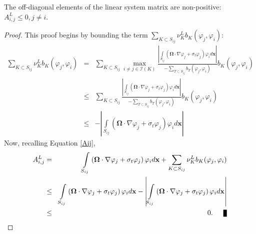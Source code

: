 \newpage
\begin{lemma}\label{offdiagonalnegative}
   The off-diagonal elements of the linear system matrix are non-positive:
   $A^L_{i,j}\le 0, j\ne i$.
\end{lemma}
\begin{proof}
This proof begins by bounding the term
$\sum\limits_{K\subset S_{ij}}\nu_K^L b_K(\varphi_j, \varphi_i)$:
\begin{eqnarray*}
   \sum\limits_{K\subset S_{ij}}\nu_K^L b_K(\varphi_j, \varphi_i)
   & = & \sum\limits_{K\subset S_{ij}} \max\limits_{i\ne j\in \mathcal{I}(K)}
      \frac{\left|\int\limits_{S_{ij}}\left(\mathbf{\Omega}\cdot\nabla\varphi_j +
		\sigma_t\varphi_j\right)\varphi_i d\mathbf{x}\right|}
		{-\sum\limits_{T\subset S_{ij}} b_T(\varphi_j, \varphi_i)}b_K(\varphi_j,\varphi_i)\\
   & \le & \sum\limits_{K\subset S_{ij}} \frac{\left|\int\limits_{S_{ij}}
      \left(\mathbf{\Omega}\cdot\nabla\varphi_j +
		\sigma_t\varphi_j\right)\varphi_i d\mathbf{x}\right|}
		{-\sum\limits_{T\subset S_{ij}} b_T(\varphi_j, \varphi_i)}b_K(\varphi_j,\varphi_i)\\
   & \le & -\left|\int\limits_{S_{ij}}\left(\mathbf{\Omega}\cdot\nabla\varphi_j +
		\sigma_t\varphi_j\right)\varphi_i d\mathbf{x}\right|
\end{eqnarray*}
Now, recalling Equation \ref{Aij},
\begin{eqnarray*}
	A^L_{i,j} & = & \int\limits_{S_{ij}}\left(\mathbf{\Omega}\cdot\nabla\varphi_j +
		\sigma_t\varphi_j\right)\varphi_i d\mathbf{x} +
		\sum\limits_{K\subset S_{ij}}\nu_K^L b_K(\varphi_j, \varphi_i)\\
      & \le & \int\limits_{S_{ij}}\left(\mathbf{\Omega}\cdot\nabla\varphi_j +
		\sigma_t\varphi_j\right)\varphi_i d\mathbf{x} -\left|\int\limits_{S_{ij}}
      \left(\mathbf{\Omega}\cdot\nabla\varphi_j +
		\sigma_t\varphi_j\right)\varphi_i d\mathbf{x}\right|\\
      & \le & 0.\qed
\end{eqnarray*}
\end{proof}

